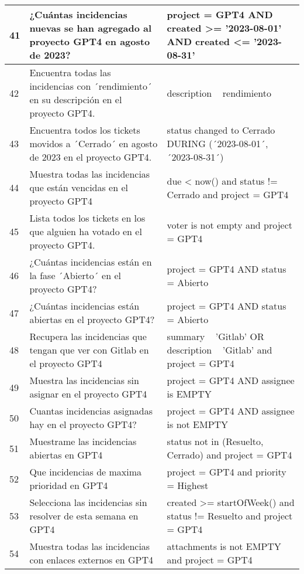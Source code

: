 \begin{center}
\begin{longtable}{ | p{1cm} | p{8cm} | p{6cm} | }
        \hline
        41 & ¿Cuántas incidencias nuevas se han agregado al proyecto GPT4 en agosto de 2023? & project = GPT4 AND created >= '2023-08-01' AND created <= '2023-08-31' \\
        \hline
        42 & Encuentra todas las incidencias con ´rendimiento´ en su descripción en el proyecto GPT4. & description ~ rendimiento \\
        \hline
        43 & Encuentra todos los tickets movidos a ´Cerrado´ en agosto de 2023 en el proyecto GPT4. & status changed to Cerrado DURING (´2023-08-01´, ´2023-08-31´) \\
        \hline
        44 & Muestra todas las incidencias que están vencidas en el proyecto GPT4 & due < now() and status != Cerrado and project = GPT4 \\
        \hline
        45 & Lista todos los tickets en los que alguien ha votado en el proyecto GPT4. & voter is not empty and project = GPT4 \\
        \hline
        46 & ¿Cuántas incidencias están en la fase ´Abierto´ en el proyecto GPT4? & project = GPT4 AND status = Abierto \\
        \hline
        47 & ¿Cuántas incidencias están abiertas en el proyecto GPT4? & project = GPT4 AND status = Abierto \\
        \hline
        48 & Recupera las incidencias que tengan que ver con Gitlab en el proyecto GPT4 & summary ~ 'Gitlab' OR description ~ 'Gitlab' and project = GPT4  \\
        \hline
        49 & Muestra las incidencias sin asignar en el proyecto GPT4 & project = GPT4 AND assignee is EMPTY \\
        \hline
        50 & Cuantas incidencias asignadas hay en el proyecto GPT4? & project = GPT4 AND assignee is not EMPTY \\
        \hline
        51 & Muestrame las incidencias abiertas en GPT4 & status not in (Resuelto, Cerrado) and project = GPT4 \\
        \hline
        52 & Que incidencias de maxima prioridad en GPT4 & project = GPT4 and priority = Highest \\
        \hline
        53 & Selecciona las incidencias sin resolver de esta semana en GPT4 & created >= startOfWeek() and status != Resuelto and project = GPT4 \\
        \hline
        54 & Muestra todas las incidencias con enlaces externos en GPT4 & attachments is not EMPTY and project = GPT4 \\

\end{longtable}
\end{center}

